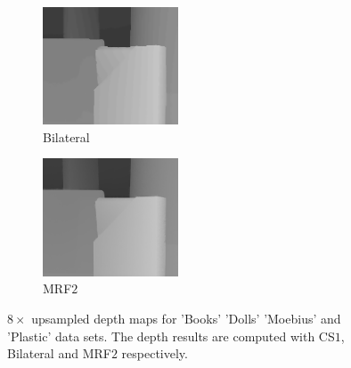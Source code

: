 \documentclass[preprint,10pt,5p,times,twocolumn]{elsarticle}
\begin{document}
\begin{figure}
\begin{subfigure}[b]{0.24\textwidth}
\includegraphics[height= 3.5cm, width=\textwidth]{fig_plastic_8X_cvpr.png}
\caption*{Bilateral}
\end{subfigure}
\begin{subfigure}[b]{0.24\textwidth}
\includegraphics[height= 3.5cm, width=\textwidth]{fig_plastic_8X_iccv.png}
\caption*{MRF$2$}
\end{subfigure}
\caption{$8\times$ upsampled depth maps for 'Books' 'Dolls'  'Moebius' and 'Plastic' data sets. The depth results are computed with CS$1$, Bilateral and MRF$2$ respectively.}
\label{fig:exp1_fig}
\end{figure}
\end{document}
